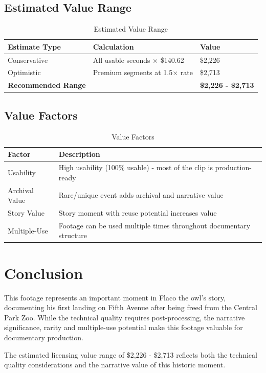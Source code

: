 \documentclass[
  11pt,
]{article}
\begin{document}
\needspace{8cm}
\subsection{Estimated Value Range}

\begin{table}[h]
\centering
\small
\caption{Estimated Value Range}
\label{tab-value-range}
\begin{tabular}{p{3cm}p{5cm}p{3cm}}
\toprule
\textbf{Estimate Type} & \textbf{Calculation} & \textbf{Value} \\
\midrule
Conservative & All usable seconds × \$140.62 & \$2,226 \\
Optimistic & Premium segments at 1.5× rate & \$2,713 \\
\textbf{Recommended Range} & & \textbf{\$2,226 - \$2,713} \\
\bottomrule
\end{tabular}
\end{table}

\needspace{12cm}
\subsection{Value Factors}

\begin{table}[h]
\centering
\small
\caption{Value Factors}
\label{tab-value-factors}
\begin{tabular}{p{3cm}p{7cm}}
\toprule
\textbf{Factor} & \textbf{Description} \\
\midrule
Usability & High usability (100\% usable) - most of the clip is production-ready \\
Archival Value & Rare/unique event adds archival and narrative value \\
Story Value & Story moment with reuse potential increases value \\
Multiple-Use & Footage can be used multiple times throughout documentary structure \\
\bottomrule
\end{tabular}
\end{table}

\section{Conclusion}

This footage represents an important moment in Flaco the owl's story,
documenting his first landing on Fifth Avenue after being freed from the
Central Park Zoo. While the technical quality requires post-processing,
the narrative significance, rarity and multiple-use potential make this
footage valuable for documentary production.

The estimated licensing value range of \$2,226 - \$2,713 reflects both
the technical quality considerations and the narrative value of this
historic moment.
\end{document}
